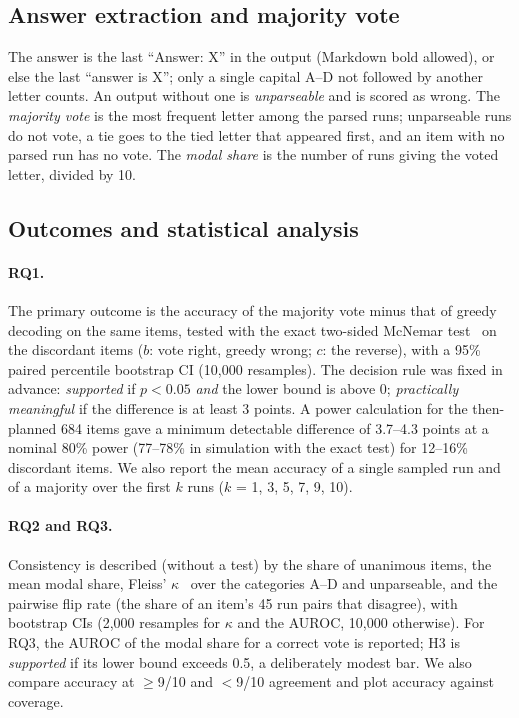 \subsection{Answer extraction and majority vote}
The answer is the last ``Answer: X'' in the output (Markdown bold allowed), or else the last ``answer is X''; only
a single capital A--D not followed by another letter counts. An output without one is \emph{unparseable} and is
scored as wrong. The \emph{majority vote} is the most frequent letter among the parsed runs; unparseable runs do not
vote, a tie goes to the tied letter that appeared first, and an item with no parsed run has no vote. The \emph{modal
share} is the number of runs giving the voted letter, divided by 10.

\subsection{Outcomes and statistical analysis}
\paragraph{RQ1.} The primary outcome is the accuracy of the majority vote minus that of greedy decoding on the same
items, tested with the exact two-sided McNemar test~\cite{mcnemar1947} on the discordant items ($b$: vote right,
greedy wrong; $c$: the reverse), with a 95\% paired percentile bootstrap CI (10{,}000 resamples). The decision rule
was fixed in advance: \emph{supported} if $p < 0.05$ \emph{and} the lower bound is above 0; \emph{practically
meaningful} if the difference is at least 3 points. A power calculation for the then-planned 684 items gave a minimum
detectable difference of 3.7--4.3 points at a nominal 80\% power (77--78\% in simulation with the exact test) for
12--16\% discordant items. We also report the mean accuracy of a single sampled run and of a majority over the first
$k$ runs ($k$ = 1, 3, 5, 7, 9, 10).
\paragraph{RQ2 and RQ3.} Consistency is described (without a test) by the share of unanimous items, the mean modal
share, Fleiss' $\kappa$~\cite{fleiss1971} over the categories A--D and unparseable, and the pairwise flip rate (the
share of an item's 45 run pairs that disagree), with bootstrap CIs (2{,}000 resamples for $\kappa$ and the AUROC,
10{,}000 otherwise). For RQ3, the AUROC of the modal share for a correct vote is reported; H3 is \emph{supported} if its
lower bound exceeds 0.5, a deliberately modest bar. We also compare accuracy at $\geq$9/10 and $<$9/10 agreement and
plot accuracy against coverage.
